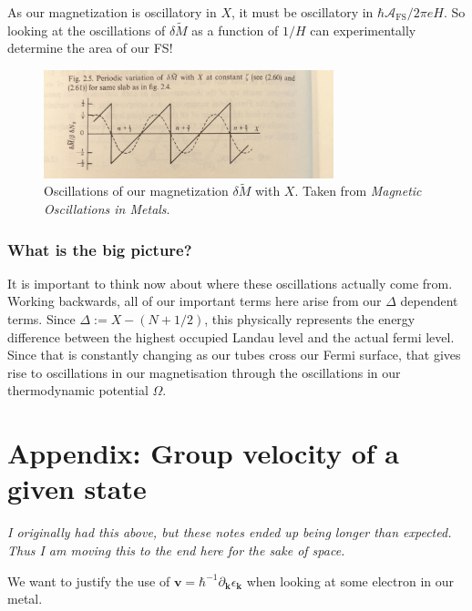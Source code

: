 \documentclass[12pt]{revtex4-2}
\begin{document}
As our magnetization is oscillatory in $X$, it must be oscillatory in $\hbar\mathcal{A}_\text{FS}/2\pi eH$.  So looking at the oscillations of $\delta \tilde{M}$ as a function of $1/H$ can experimentally determine the area of our FS!

\begin{figure}[tb]
\centering
\includegraphics[width=0.75\textwidth]{figures/oscillations_magnetization.jpg}
\caption{Oscillations of our magnetization $\delta \tilde{M}$ with $X$.  Taken from \textit{Magnetic Oscillations in Metals}.}
\label{fig:oscillations-mag}
\end{figure}

\subsubsection*{What is the big picture?}
It is important to think now about where these oscillations actually come from.  Working backwards, all of our important terms here arise from our $\Delta$ dependent terms.  Since $\Delta := X - (N + 1/2)$, this physically represents the energy difference between the highest occupied Landau level and the actual fermi level.  Since that is constantly changing as our tubes cross our Fermi surface, that gives rise to oscillations in our magnetisation through the oscillations in our thermodynamic potential $\Omega$.  

\newpage
\section{Appendix: Group velocity of a given state}

\em I originally had this above, but these notes ended up being longer than expected.  Thus I am moving this to the end here for the sake of space. \em 
\par

We want to justify the use of $\mathbf{v} = \hbar^{-1}\partial_\mathbf{k}\epsilon_\mathbf{k}$ when looking at some electron in our metal.
\par
\end{document}
